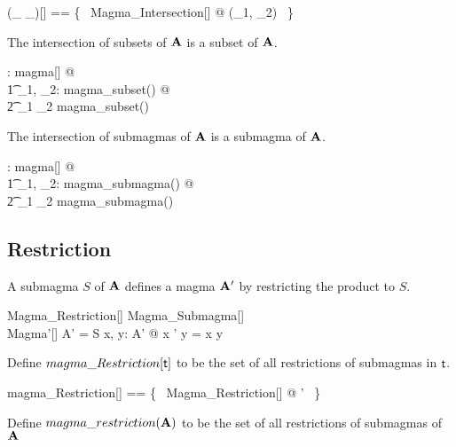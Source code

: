 \documentclass{amsart}
\begin{document}
\begin{zed}
	(\_ \capMagma \_)[\genT] == \{~ Magma\_Intersection[\genT] @ (\strucS_1, \strucS_2) \mapsto \strucS ~\}
\end{zed}

\begin{remark}
The intersection of subsets of $\mathbf{A}$ is a subset of $\mathbf{A}$.

\begin{zed}
	\forall \strucA: magma[\setT] @ \\
	\t1	\forall \strucS_1, \strucS_2: magma\_subset(\strucA) @ \\
	\t2		\strucS_1 \capMagma \strucS_2 \in magma\_subset(\strucA)
\end{zed}

\end{remark}

\begin{remark}
The intersection of submagmas of $\mathbf{A}$ is a submagma of $\mathbf{A}$.

\begin{zed}
	\forall \strucA: magma[\setT] @ \\
	\t1	\forall \strucS_1, \strucS_2: magma\_submagma(\strucA) @ \\
	\t2		\strucS_1 \capMagma \strucS_2 \in magma\_submagma(\strucA)
\end{zed}

\end{remark}

\subsection{Restriction}

A submagma $S$ of $\mathbf{A}$ defines a magma $\mathbf{A}'$ by restricting the
product to $S$.

\begin{schema}{Magma\_Restriction}[\genT]
	Magma\_Submagma[\genT] \\
	Magma'[\genT]
\where
	A' = S
\also
	\forall x, y: A' @ x \opG' y = x \opG y
\end{schema}

Define $magma\_Restriction[\mathsf{t}]$ to be the set of all restrictions of submagmas in $\mathsf{t}$.

\begin{zed}
	magma\_Restriction[\genT] == \{~ Magma\_Restriction[\genT] @ \strucS \mapsto \strucA' ~\}
\end{zed}

Define $magma\_restriction(\mathbf{A})$ to be the set of all restrictions of submagmas of $\mathbf{A}$
\end{document}
